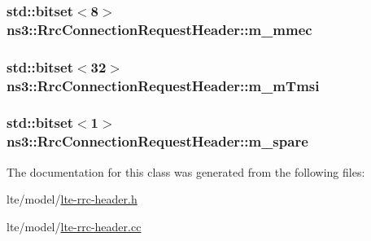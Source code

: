 \subsubsection[{\texorpdfstring{m\+\_\+mmec}{m_mmec}}]{\setlength{\rightskip}{0pt plus 5cm}std\+::bitset$<$8$>$ ns3\+::\+Rrc\+Connection\+Request\+Header\+::m\+\_\+mmec\hspace{0.3cm}{\ttfamily [private]}}\hypertarget{classns3_1_1RrcConnectionRequestHeader_abab1a31ce6a91e3d27bc67b0669ad204}{}\label{classns3_1_1RrcConnectionRequestHeader_abab1a31ce6a91e3d27bc67b0669ad204}
\subsubsection[{\texorpdfstring{m\+\_\+m\+Tmsi}{m_mTmsi}}]{\setlength{\rightskip}{0pt plus 5cm}std\+::bitset$<$32$>$ ns3\+::\+Rrc\+Connection\+Request\+Header\+::m\+\_\+m\+Tmsi\hspace{0.3cm}{\ttfamily [private]}}\hypertarget{classns3_1_1RrcConnectionRequestHeader_acbd02a83e227f832fe6c0143d74737e3}{}\label{classns3_1_1RrcConnectionRequestHeader_acbd02a83e227f832fe6c0143d74737e3}
\subsubsection[{\texorpdfstring{m\+\_\+spare}{m_spare}}]{\setlength{\rightskip}{0pt plus 5cm}std\+::bitset$<$1$>$ ns3\+::\+Rrc\+Connection\+Request\+Header\+::m\+\_\+spare\hspace{0.3cm}{\ttfamily [private]}}\hypertarget{classns3_1_1RrcConnectionRequestHeader_a717284d392b79a8344d76bb526e7f6fc}{}\label{classns3_1_1RrcConnectionRequestHeader_a717284d392b79a8344d76bb526e7f6fc}


The documentation for this class was generated from the following files\+:\begin{DoxyCompactItemize}
\item 
lte/model/\hyperlink{lte-rrc-header_8h}{lte-\/rrc-\/header.\+h}\item 
lte/model/\hyperlink{lte-rrc-header_8cc}{lte-\/rrc-\/header.\+cc}\end{DoxyCompactItemize}
